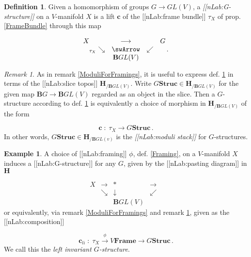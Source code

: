 \documentclass[12pt,titlepage]{article}
\def\mathllap{\mathpalette\mathllapinternal}
\def\mathllapinternal#1#2{\llap{$\mathsurround=0pt#1{#2}$}}
\newcommand{\itexarray}[1]{\begin{matrix}#1\end{matrix}}
\theoremstyle{plain}
\theoremstyle{definition}
\newtheorem{defn}{Definition}
\newtheorem{example}{Example}
\theoremstyle{remark}
\newtheorem{remark}{Remark}
\begin{document}
\begin{defn}
\label{GStructure}\hypertarget{GStructure}{}
Given a homomorphism of groups $G \longrightarrow GL(V)$, a \emph{[[nLab:G-structure]]} on a $V$-manifold $X$ is a lift $\mathbf{c}$ of the [[nLab:frame bundle]] $\tau_X$ of prop. \ref{FrameBundle} through this map

\begin{displaymath}
\itexarray{
    X && \stackrel{}{\longrightarrow} && G
    \\
    & {}_{\mathllap{\tau_X}}\searrow &\swArrow& \swarrow
    \\
    && \mathbf{B}GL(V)
  }
  \,.
\end{displaymath}
\end{defn}
\begin{remark}
\label{ModuliForGStructures}\hypertarget{ModuliForGStructures}{}
As in remark \ref{ModuliForFramings}, it is useful to express def. \ref{GStructure} in terms of the [[nLab:slice topos]] $\mathbf{H}_{/\mathbf{B}GL(V)}$. Write $G\mathbf{Struc}\in \mathbf{H}_{/\mathbf{B}GL(V)}$ for the given map $\mathbf{B}G\to \mathbf{B}GL(V)$ regarded as an object in the slice. Then a $G$-structure according to def. \ref{GStructure} is equivalently a choice of morphism in $\mathbf{H}_{/\mathbf{B}GL(V)}$ of the form

\begin{displaymath}
\mathbf{c} \;\colon\; \tau_X \longrightarrow G\mathbf{Struc}
  \,.
\end{displaymath}
In other words, $G\mathbf{Struc} \in \mathbf{H}_{/\mathbf{B}GL(v)}$ is the \emph{[[nLab:moduli stack]]} for $G$-structures.

\end{remark}
\begin{example}
\label{GStructureFromLeftTranslationFraming}\hypertarget{GStructureFromLeftTranslationFraming}{}
A choice of [[nLab:framing]] $\phi$, def. \ref{Framing}, on a $V$-manifold $X$ induces a [[nLab:G-structure]] for any $G$, given by the [[nLab:pasting diagram]] in $\mathbf{H}$

\begin{displaymath}
\itexarray{
     X &\longrightarrow& \ast &\longrightarrow&
     \\
     & \searrow & \downarrow & \swarrow
     \\
     && \mathbf{B}GL(V)
  }
\end{displaymath}
or equivalently, via remark \ref{ModuliForFramings} and remark \ref{ModuliForGStructures}, given as the [[nLab:composition]]

\begin{displaymath}
\mathbf{c}_{li}
  \;\colon\;
  \tau_X \stackrel{\phi}{\longrightarrow} V\mathbf{Frame} \longrightarrow G\mathbf{Struc}\,.
\end{displaymath}
We call this the \emph{left invariant $G$-structure}.

\end{example}
\end{document}

